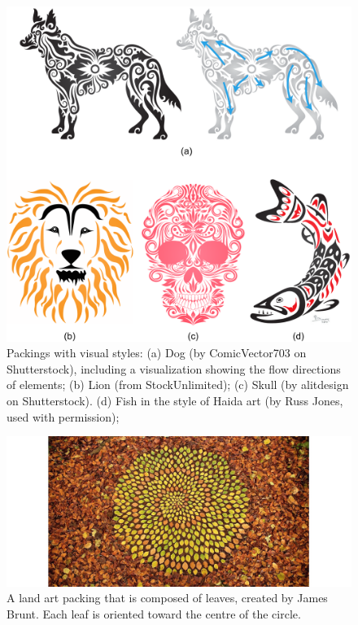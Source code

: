 \begin{figure}
\centering
\includegraphics[width=1.0\textwidth]{figures/intro/dog_ornament_flow.pdf} 
\caption[Packings with flow visual styles]
{\label{fig_dog_flow} 
\newtext
{
Packings with  visual styles:}
(a) Dog (by ComicVector703 on Shutterstock), 
including a visualization showing the flow directions of elements; 
(b) Lion (from StockUnlimited);  
(c) Skull (by alitdesign on Shutterstock).
(d) Fish in the style of Haida art (by Russ Jones, used with permission); 
 }
\end{figure}



\begin{figure}
\centering
\includegraphics[width=1.0\textwidth]{figures/intro/woodland.jpg} 
\caption[A land art packing]
{\label{fig_woodland} 
\newtext
{
A land art packing that is composed of leaves, created by James Brunt. 
Each leaf is oriented toward the centre of the circle.
}
 }
\end{figure}

